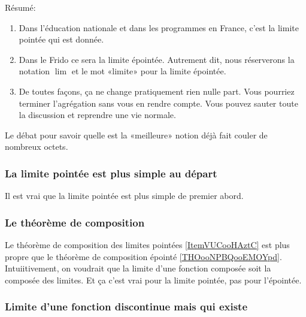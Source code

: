 Résumé:
\begin{enumerate}
    \item
        Dans l'éducation nationale et dans les programmes en France, c'est la limite pointée qui est donnée.
    \item
        Dans le Frido ce sera la limite épointée. Autrement dit, nous réserverons la notation \( \lim\) et le mot «limite» pour la limite épointée.
    \item
        De toutes façons, ça ne change pratiquement rien nulle part. Vous pourriez terminer l'agrégation sans vous en rendre compte. Vous pouvez sauter toute la discussion et reprendre une vie normale.
\end{enumerate}

Le débat pour savoir quelle est la «meilleure» notion déjà fait couler de nombreux octets\cite{BIBooKNWHooBRoxme,BIBooNUKAooVMqppa,BIBooDILKooUcmUVD,BIBooJDPPooVONaQV,BIBooUIAFooHqKjQh}.


\subsubsection{La limite pointée est plus simple au départ}

Il est vrai que la limite pointée est plus simple de premier abord.

\subsubsection{Le théorème de composition}

Le théorème de composition des limites pointées \ref{ItemVUCooHAztC} est plus propre que le théorème de composition épointé \ref{THOooNPBQooEMOYpd}. Intuiitivement, on voudrait que la limite d'une fonction composée soit la composée des limites. Et ça c'est vrai pour la limite pointée, pas pour l'épointée.

\subsubsection{Limite d'une fonction discontinue mais qui existe}

